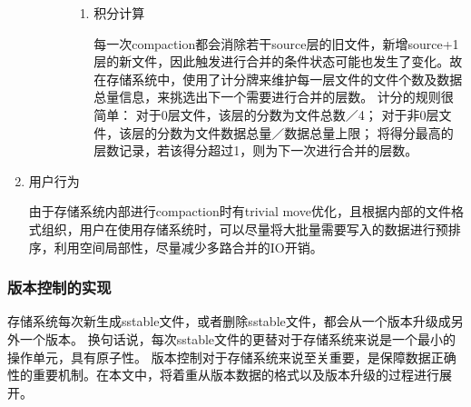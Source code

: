 \begin{enumerate}
\begin{enumerate}
\begin{enumerate}
\begin{enumerate}
	\item 积分计算
	
	每一次compaction都会消除若干source层的旧文件，新增source+1层的新文件，因此触发进行合并的条件状态可能也发生了变化。故在存储系统中，使用了计分牌来维护每一层文件的文件个数及数据总量信息，来挑选出下一个需要进行合并的层数。
	计分的规则很简单：
	对于0层文件，该层的分数为文件总数／4；
	对于非0层文件，该层的分数为文件数据总量／数据总量上限；
	将得分最高的层数记录，若该得分超过1，则为下一次进行合并的层数。
				\end{enumerate}
				
				\end{enumerate}
				
				
				
			\end{enumerate}

			\item 用户行为
			
			由于存储系统内部进行compaction时有trivial move优化，且根据内部的文件格式组织，用户在使用存储系统时，可以尽量将大批量需要写入的数据进行预排序，利用空间局部性，尽量减少多路合并的IO开销。

		\end{enumerate}
		


		\subsubsection{版本控制的实现}

		存储系统每次新生成sstable文件，或者删除sstable文件，都会从一个版本升级成另外一个版本。
			换句话说，每次sstable文件的更替对于存储系统来说是一个最小的操作单元，具有原子性。
			版本控制对于存储系统来说至关重要，是保障数据正确性的重要机制。在本文中，将着重从版本数据的格式以及版本升级的过程进行展开。


